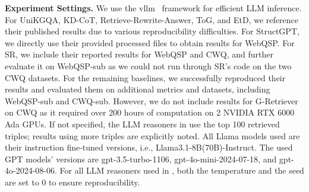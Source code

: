 
\vspace{2mm}
\textbf{Experiment Settings.} We use the vllm~\citep{kwon2023efficient} framework for efficient LLM inference. For UniKGQA, KD-CoT, Retrieve-Rewrite-Answer, ToG, and EtD, we reference their published results due to various reproducibility difficulties. For StructGPT, we directly use their provided processed files to obtain results for WebQSP. For SR, we include their reported results for WebQSP and CWQ, and further evaluate it on WebQSP-sub as we could not run through SR's code on the two CWQ datasets. For the remaining baselines, we successfully reproduced their results and evaluated them on additional metrics and datasets, including WebQSP-sub and CWQ-sub. However, we do not include results for G-Retriever on CWQ as it required over 200 hours of computation on 2 NVIDIA RTX 6000 Ada GPUs. If not specified, the LLM reasoners in \proj use the top 100 retrieved triples; results using more triples are explicitly noted. All Llama models used are their instruction fine-tuned versions, i.e., Llama3.1-8B(70B)-Instruct. The used GPT models' versions are gpt-3.5-turbo-1106, gpt-4o-mini-2024-07-18, and gpt-4o-2024-08-06.
For all LLM reasoners used in \proj, both the temperature and the seed are set to 0 to ensure reproducibility.


